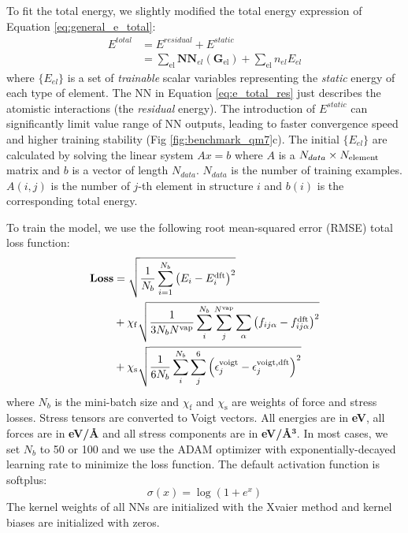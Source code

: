 \documentclass[preprint]{revtex4-2}
\begin{document}
To fit the total energy, we slightly modified the total energy expression of 
Equation \ref{eq:general_e_total}:
\begin{align}
\label{eq:e_total_res}
E^{total} & = E^{residual} + E^{static} \nonumber \\
& = \sum_{\mathrm{el}}{\mathbf{NN}_{el}\left(\mathbf{G}_{\mathrm{el}}\right)}
+ \sum_{\mathrm{el}}{n_{el}E_{el}}
\end{align}
where $\{E_{el}\}$ is a set of \textit{trainable} scalar variables representing 
the \textit{static} energy of each type of element\cite{kCON}. The NN in 
Equation \ref{eq:e_total_res} just describes the atomistic interactions 
(the \textit{residual} energy). 
The introduction of $E^{static}$ can significantly limit value range of NN 
outputs, leading to faster convergence speed and higher training stability 
(Fig \ref{fig:benchmark_qm7}c). The initial $\{E_{el}\}$ are calculated by 
solving the linear system $Ax=b$ where $A$ is a $N_{data} \times N_{\mathrm{element}}$ matrix 
and $b$ is a vector of length $N_{data}$. $N_{data}$ is the number of training 
examples. $A(i,j)$ is the number of $j$-th element in structure $i$ and $b(i)$ 
is the corresponding total energy.

To train the model, we use the following root mean-squared error (RMSE) total 
loss function:
\begin{align}
\label{eq:loss}
\mathbf{Loss} & = \sqrt{\frac{1}{N_{b}}\sum_{i=1}^{N_{b}}{\left(
    E_{i} - E_{i}^{\mathrm{dft}}
\right)^2}} \nonumber \\
& + \chi_{\mathrm{f}}\sqrt{
    \frac{1}{3 N_{b} N^{\mathrm{vap}}}\sum_{i}^{N_b}{\sum_{j}^{N^{\mathrm{vap}}}{
        \sum_{\alpha}{
            \left(f_{ij\alpha} - f_{ij\alpha}^{\mathrm{dft}}\right)^2
        }
    }}
} \nonumber \\
& + \chi_{\mathrm{s}}\sqrt{\frac{1}{6N_b}\sum_{i}^{N_b}{
    \sum_{j}^{6}{
        \left(
            \epsilon^{\mathrm{voigt}}_{j} - \epsilon^{\mathrm{voigt,dft}}_{j}
        \right)^2
    }
}}
\end{align}
where $N_b$ is the mini-batch size and $\chi_{\mathrm{f}}$ and 
$\chi_{\mathrm{s}}$ are weights of force and stress losses. 
Stress tensors are converted to Voigt vectors. All energies are in \textbf{eV}, 
all forces are in \textbf{eV/\AA} and all stress components are in 
\textbf{eV/\AA}$\mathbf{^3}$. In most cases, we set $N_b$ to 50 or 100 and we
use the ADAM\cite{adam} optimizer with exponentially-decayed learning rate to 
minimize the loss function. The default activation function is softplus:
\begin{equation}
\sigma(x) = \log(1 + e^x)
\end{equation}
The kernel weights of all NNs are initialized with the 
Xvaier\cite{pmlr-v9-glorot10a} method and kernel biases are initialized with 
zeros.
\end{document}
